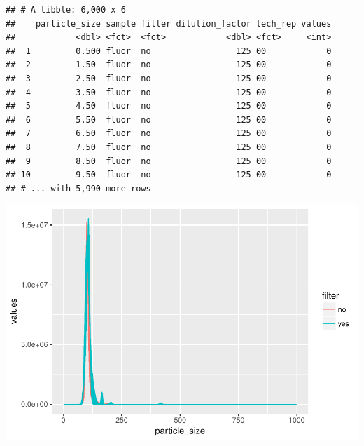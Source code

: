 \documentclass[10pt,letterpaper]{article}
\newenvironment{Shaded}{\begin{snugshade}}{\end{snugshade}}
\newcommand{\KeywordTok}[1]{\textcolor[rgb]{0.13,0.29,0.53}{\textbf{#1}}}
\newcommand{\DataTypeTok}[1]{\textcolor[rgb]{0.13,0.29,0.53}{#1}}
\newcommand{\StringTok}[1]{\textcolor[rgb]{0.31,0.60,0.02}{#1}}
\newcommand{\OperatorTok}[1]{\textcolor[rgb]{0.81,0.36,0.00}{\textbf{#1}}}
\newcommand{\NormalTok}[1]{#1}
\begin{document}
\begin{Shaded}
\end{Shaded}

\begin{verbatim}
## # A tibble: 6,000 x 6
##    particle_size sample filter dilution_factor tech_rep values
##            <dbl> <fct>  <fct>            <dbl> <fct>     <int>
##  1         0.500 fluor  no                 125 00            0
##  2         1.50  fluor  no                 125 00            0
##  3         2.50  fluor  no                 125 00            0
##  4         3.50  fluor  no                 125 00            0
##  5         4.50  fluor  no                 125 00            0
##  6         5.50  fluor  no                 125 00            0
##  7         6.50  fluor  no                 125 00            0
##  8         7.50  fluor  no                 125 00            0
##  9         8.50  fluor  no                 125 00            0
## 10         9.50  fluor  no                 125 00            0
## # ... with 5,990 more rows
\end{verbatim}

\begin{Shaded}
\end{Shaded}

\includegraphics{reproducible_analysis_files/figure-latex/unnamed-chunk-10-1.pdf}
\end{document}
